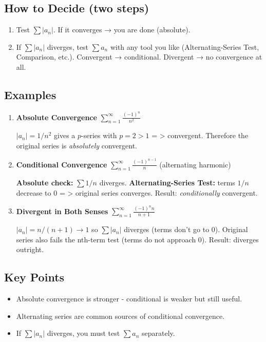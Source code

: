 \documentclass{article}
\begin{document}
\subsection*{How to Decide (two steps)}
\begin{enumerate}[itemsep=2pt]
  \item Test \(\displaystyle\sum |a_n|\).
        If it converges → you are done (absolute).
  \item If \(\sum |a_n|\) diverges, test \(\sum a_n\) with any tool you like
        (Alternating-Series Test, Comparison, etc.).
        Convergent → conditional. Divergent → no convergence at all.
\end{enumerate}

\subsection*{Examples}

\begin{enumerate}[label=\textbf{\arabic*.},itemsep=12pt]

  \item \textbf{Absolute Convergence}
        \(\displaystyle\sum_{n=1}^{\infty} \frac{(-1)^{n}}{n^{2}}\)

        \(|a_n| = 1/n^{2}\) gives a \(p\)-series with \(p=2>1\)  = > convergent.
        Therefore the original series is \emph{absolutely} convergent.

  \item \textbf{Conditional Convergence}
        \(\displaystyle\sum_{n=1}^{\infty}\frac{(-1)^{n-1}}{n}\) (alternating harmonic)

        \textbf{Absolute check:} \(\sum 1/n\) diverges.
        \textbf{Alternating-Series Test:} terms \(1/n\) decrease to 0 = > original series converges.
        Result: \emph{conditionally} convergent.

  \item \textbf{Divergent in Both Senses}
        \(\displaystyle\sum_{n=1}^{\infty} \frac{(-1)^{n} n}{n+1}\)

        \(|a_n| = n/(n+1) \to 1\) so \(\sum |a_n|\) diverges (terms don’t go to 0).
        Original series also fails the nth-term test (terms do not approach 0).
        Result: diverges outright.

\end{enumerate}

\subsection*{Key Points}
\begin{itemize}[itemsep=4pt]
  \item Absolute convergence is stronger - conditional is weaker but still useful.
  \item Alternating series are common sources of conditional convergence.
  \item If \(\sum |a_n|\) diverges, you must test \(\sum a_n\) separately.
\end{itemize}
\end{document}
